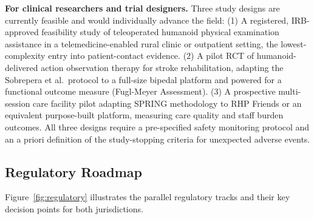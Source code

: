 \textbf{For clinical researchers and trial designers.} Three study designs are
currently feasible and would individually advance the field: (1) A registered,
IRB-approved feasibility study of teleoperated humanoid physical examination
assistance in a telemedicine-enabled rural clinic or outpatient setting, the
lowest-complexity entry into patient-contact evidence. (2) A pilot RCT of
humanoid-delivered action observation therapy for stroke rehabilitation, adapting
the Sobrepera et al.\ protocol to a full-size bipedal platform and powered for
a functional outcome measure (Fugl-Meyer Assessment). (3) A prospective
multi-session care facility pilot adapting SPRING methodology to RHP Friends or
an equivalent purpose-built platform, measuring care quality and staff burden
outcomes. All three designs require a pre-specified safety monitoring protocol
and an a priori definition of the study-stopping criteria for unexpected adverse
events.

\subsection{Regulatory Roadmap}
\label{sec:roadmap}

Figure~\ref{fig:regulatory} illustrates the parallel regulatory tracks and their
key decision points for both jurisdictions.

